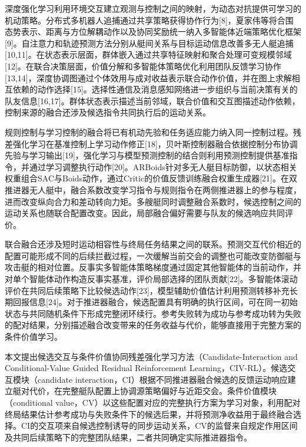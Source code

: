\documentclass[UTF8,a4paper,zihao=5,fontset=none]{ctexart}
\begin{document}
深度强化学习利用环境交互建立观测与控制之间的映射，为动态对抗提供可学习的机动策略。分布式多机器人追捕通过共享策略获得协作行为{[}8{]}，夏家伟等将合围态势表示、距离与方位解耦动作以及协同奖励统一纳入多智能体近端策略优化框架{[}9{]}。自注意力和轨迹预测方法分别从艇间关系与目标运动信息改善多无人艇追捕{[}10,11{]}。在状态表示层面，群体嵌入通过共享特征映射和聚合处理可变规模邻域{[}12{]}。在联合决策层面，价值分解和多智能体策略优化利用团队反馈学习协作{[}13,14{]}，深度协调图通过个体效用与成对收益表示联合动作价值，并在图上求解相互依赖的动作选择{[}15{]}。选择性通信及消息感知网络进一步组织与当前决策有关的队友信息{[}16,17{]}。群体状态表示描述当前邻域，联合价值和交互图描述动作依赖，控制来源的融合还涉及候选指令共同执行后的运动关系。

规则控制与学习控制的融合将已有机动先验和任务适应能力纳入同一控制过程。残差强化学习在基准控制上学习动作修正{[}18{]}，贝叶斯控制器融合依据控制分布协调先验与学习输出{[}19{]}，强化学习与模型预测控制的结合则利用预测控制提供基准指令，并通过学习调整执行动作{[}20{]}。ARBoids针对多无人艇目标防御，以状态相关权重组合SAC与Boids动作，通过Critic的价值反馈训练融合权重生成器{[}21{]}。在双推进器无人艇中，融合系数改变学习指令与规则指令在两侧推进器上的参与程度，进而改变纵向合力和差动转向力矩。多艘艇同时调整融合系数时，候选控制之间的运动关系也随联合配置改变。因此，局部融合偏好需要与队友的候选响应共同评价。

联合融合还涉及短时运动相容性与终局任务结果之间的联系。预测交互代价相近的配置可能形成不同的后续拦截过程，一次缓解当前交会的调整也可能改变防御艇与攻击艇的相对位置。反事实多智能体策略梯度通过固定其他智能体的当前动作，并对单个智能体动作构造反事实基准，评价局部选择的团队贡献{[}22{]}。多智能体滚动评价在共同后续策略下比较候选动作{[}23{]}，模型辅助价值估计利用预测转移补充长期回报信息{[}24{]}。对于推进器融合，候选配置具有明确的执行区间，可在同一初始状态与共同随机条件下形成完整闭环续行。参考失败转为成功与参考成功转为失败的配对结果，分别描述融合改变带来的任务收益与代价，能够直接用于完整方案的条件价值学习。

本文提出候选交互与条件价值协同残差强化学习方法（Candidate-Interaction
and Conditional-Value Guided Residual Reinforcement
Learning，CIV-RL）。候选交互模块（candidate
interaction，CI）根据不同推进器融合候选的反馈运动响应建立艇对代价，在完整艇队配置上协调源策略偏好与近距交会。条件价值模块（conditional
value，CV）以这些配置对应的完整执行方案为学习对象，利用配对终局结果估计参考成功与失败条件下的候选后果，并将预测净收益用于最终融合选择。CI的交互项来自候选控制诱导的同步运动关系，CV的监督来自规定作用区间及共同后续策略下的完整团队结果，二者共同确定实际推进器指令。
\end{document}
